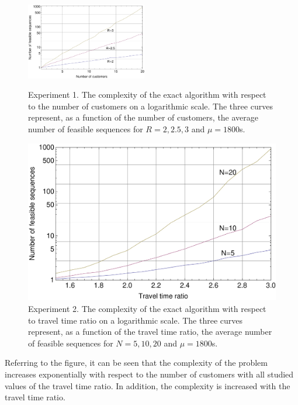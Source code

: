 \documentclass[dissertation,draft*]{aaltoseries}
\begin{document}
\begin{figure}
\centering
\parbox{0.45\textwidth}{
\includegraphics[width=0.47\textwidth]{nvertailu01.pdf}
\caption{\tiny Experiment 1. The complexity of the exact algorithm with respect to the number of customers on a logarithmic scale. 
The three curves represent, as a function of the number of customers, the average number of feasible sequences 
for $R=2,2.5,3$ and $\mu=1800$s. }
\label{nvertailu01}
}
\qquad
\begin{minipage}{0.45\textwidth}
\includegraphics[width=1.0\textwidth]{ttivertailu01.pdf}
\caption{\tiny  Experiment 2. The complexity of the exact algorithm with respect to travel time ratio on a logarithmic scale. 
The three curves represent, as a function of the travel time ratio, the average number of feasible sequences
for $N=5,10,20$ and $\mu = 1800$s.}
\label{ttivertailu01}
\end{minipage}
\end{figure}





Referring to the figure, it can be seen that the complexity of the problem increases exponentially
with respect to the number of customers with all studied values of the travel time ratio.  
In addition, the complexity is increased with the travel time ratio. 
\end{document}
